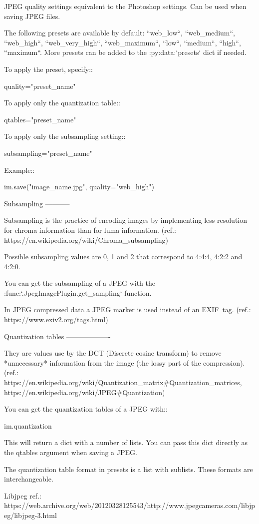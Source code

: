 \begin{DoxyVerb}JPEG quality settings equivalent to the Photoshop settings.
Can be used when saving JPEG files.

The following presets are available by default:
``web_low``, ``web_medium``, ``web_high``, ``web_very_high``, ``web_maximum``,
``low``, ``medium``, ``high``, ``maximum``.
More presets can be added to the :py:data:`presets` dict if needed.

To apply the preset, specify::

  quality="preset_name"

To apply only the quantization table::

  qtables="preset_name"

To apply only the subsampling setting::

  subsampling="preset_name"

Example::

  im.save("image_name.jpg", quality="web_high")

Subsampling
-----------

Subsampling is the practice of encoding images by implementing less resolution
for chroma information than for luma information.
(ref.: https://en.wikipedia.org/wiki/Chroma_subsampling)

Possible subsampling values are 0, 1 and 2 that correspond to 4:4:4, 4:2:2 and
4:2:0.

You can get the subsampling of a JPEG with the
:func:`.JpegImagePlugin.get_sampling` function.

In JPEG compressed data a JPEG marker is used instead of an EXIF tag.
(ref.: https://www.exiv2.org/tags.html)


Quantization tables
-------------------

They are values use by the DCT (Discrete cosine transform) to remove
*unnecessary* information from the image (the lossy part of the compression).
(ref.: https://en.wikipedia.org/wiki/Quantization_matrix#Quantization_matrices,
https://en.wikipedia.org/wiki/JPEG#Quantization)

You can get the quantization tables of a JPEG with::

  im.quantization

This will return a dict with a number of lists. You can pass this dict
directly as the qtables argument when saving a JPEG.

The quantization table format in presets is a list with sublists. These formats
are interchangeable.

Libjpeg ref.:
https://web.archive.org/web/20120328125543/http://www.jpegcameras.com/libjpeg/libjpeg-3.html\end{DoxyVerb}
 

